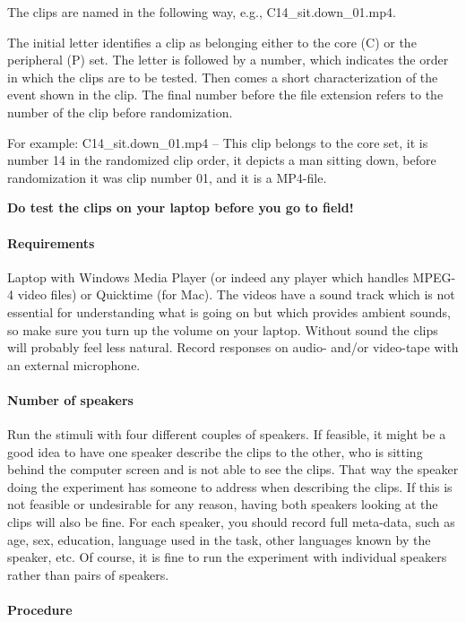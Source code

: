 The clips are named in the following way, e.g., C14\_sit.down\_01.mp4.

The initial letter identifies a clip as belonging either to the core (C) or the peripheral (P) set. The letter is followed by a number, which indicates the order in which the clips are to be tested. Then comes a short characterization of the event shown in the clip. The final number before the file extension refers to the number of the clip before randomization.

For example: C14\_sit.down\_01.mp4 -- This clip belongs to the core set, it is number 14 in the randomized clip order, it depicts a man sitting down, before randomization it was clip number 01, and it is a MP4-file.

{\bfseries Do test the clips on your laptop before you go to field!}

\paragraph{Requirements}

Laptop with Windows Media Player (or indeed any play\-er which handles MPEG-4 video files) or Quicktime (for Mac). The videos have a sound track which is not essential for understanding what is going on but which provides ambient sounds, so make sure you turn up the volume on your laptop. Without sound the clips will probably feel less natural. Record responses on audio- and/or video-tape with an external microphone.

\paragraph{Number of speakers}

Run the stimuli with four different couples of speakers. If feasible, it might be a good idea to have one speaker describe the clips to the other, who is sitting behind the computer screen and is not able to see the clips. That way the speaker doing the experiment has someone to address when describing the clips. If this is not feasible or undesirable for any reason, having both speakers looking at the clips will also be fine. For each speaker, you should record full meta-data, such as age, sex, education, language used in the task, other languages known by the speaker, etc. Of course, it is fine to run the experiment with individual speakers rather than pairs of speakers.

\paragraph{Procedure}

